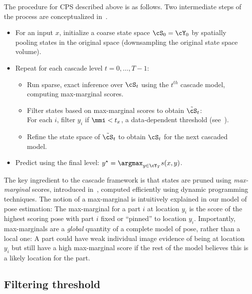 The procedure for CPS described above is as follows.  Two intermediate steps of the process are conceptualized in~.

\begin{itemize}
\item For an input $x$, initialize a coarse state space $\cS_0 = \cY_0$ by 
spatially pooling states in the original space (downsampling the original state space 
volume).

\item Repeat for each cascade level $t = 0,\ldots,T-1$:
\begin{itemize}
\item Run sparse, exact inference over  $\cS_t$ using the $t^{th}$ cascade 
model, computing max-marginal scores.
\item Filter states based on max-marginal scores to obtain $\tilde{\cS}_t$:\\
\indent For each $i$, filter $y_i$ if $\mmi < t_x$, a data-dependent threshold (see~).

 \item Refine the state space of $\tilde{\cS}_t$ to obtain $\cS_t$ for 
the next cascaded model.
\end{itemize}
\item Predict using the final level: $y^\star = \argmax_{y \in \cY_T} s(x,y)$.
\end{itemize}


The key ingredient to the cascade framework is that states are pruned using 
{\em max-marginal} scores, introduced in~, computed 
efficiently using dynamic programming techniques.  The notion of a max-marginal 
is intuitively explained in our model of pose estimation:  The max-marginal for 
a part $i$ at location $y_i$ is the score of the highest scoring pose with part $i$ fixed or ``pinned'' to location $y_i$. Importantly, max-marginals are a {\em 
global} quantity of a complete model of pose, rather than a local one: A part 
could have weak individual image evidence of being at location $y_i$ but still 
have a high max-marginal score if the rest of the model believes this is a 
likely location for the part. 

\subsection{Filtering threshold}\label{sec:cps-thresh}

